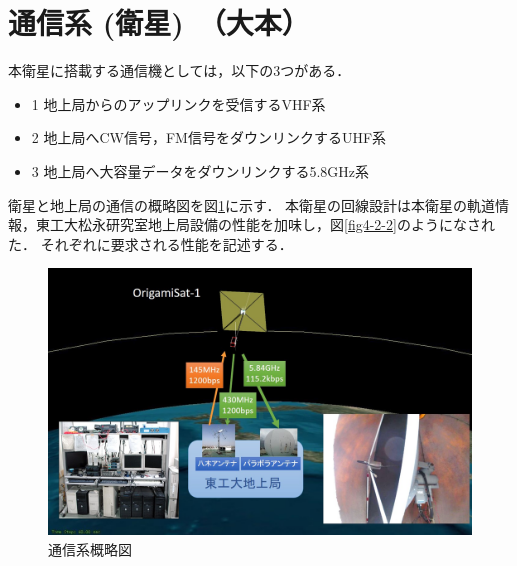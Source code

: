 \section{通信系 (衛星)　（大本）}

本衛星に搭載する通信機としては，以下の3つがある．
\begin{itemize}
	\item {1} 地上局からのアップリンクを受信するVHF系
	\item {2} 地上局へCW信号，FM信号をダウンリンクするUHF系
	\item {3} 地上局へ大容量データをダウンリンクする5.8GHz系
\end{itemize}

衛星と地上局の通信の概略図を図\ref{fig4-2-1}に示す．
本衛星の回線設計は本衛星の軌道情報，東工大松永研究室地上局設備の性能を加味し，図\ref{fig4-2-2}のようになされた．
それぞれに要求される性能を記述する．
\begin{figure}[H]
	\centering
	\includegraphics[scale=0.5]{03/fig/4-2-1.jpg}
	\caption{通信系概略図}
	\label{fig4-2-1}
\end{figure}
